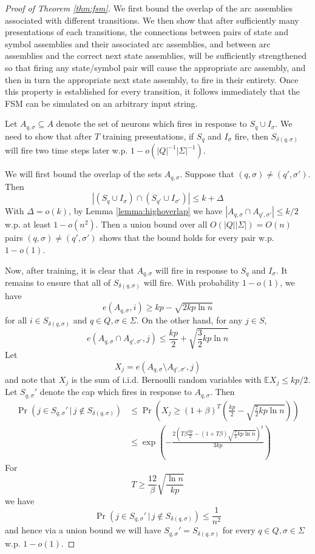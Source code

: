 \documentclass[12pt,nosubfloats]{alt2024} %
\newcommand{\E}{\mathbb{E}}
\newcommand{\1}{\mathbbm{1}}
\newcommand{\cond}{\, | \,}
\begin{document}
\begin{proof}[Proof of Theorem \ref{thm:fsm}]
We first bound the overlap of the arc assemblies associated with different transitions. We then show that after sufficiently many presentations of each transitions, the connections between pairs of state and symbol assemblies and their associated arc assemblies, and between arc assemblies and the correct next state assemblies, will be sufficiently strengthened so that firing any state/symbol pair will cause the appropriate arc assembly, and then in turn the appropriate next state assembly, to fire in their entirety. Once this property is established for every transition, it follows immediately that the FSM can be simulated on an arbitrary input string.

Let $A_{q, \sigma} \subseteq A$ denote the set of neurons which fires in response to $S_q \cup I_\sigma$. We need to show that after $T$ training presentations, if $S_q$ and $I_\sigma$ fire, then $S_{\delta(q, \sigma)}$ will fire two time steps later w.p. $1 - o(|Q|^{-1}|\Sigma|^{-1})$. 

We will first bound the overlap of the sets $A_{q, \sigma}$. Suppose that $(q, \sigma) \neq (q', \sigma')$. Then
\[|(S_q \cup I_\sigma) \cap (S_{q'} \cup I_{\sigma'})| \le k + \Delta\]
With $\Delta = o(k)$, by Lemma \ref{lemma:highoverlap} we have $|A_{q, \sigma} \cap A_{q', \sigma'}| \le k/2$ w.p. at least $1 - o(n^2)$. Then a union bound over all $O(|Q||\Sigma|) = O(n)$ pairs $(q, \sigma) \neq (q', \sigma')$ shows that the bound holds for every pair w.p. $1 - o(1)$. 

Now, after training, it is clear that $A_{q, \sigma}$ will fire in response to $S_q$ and $I_\sigma$. It remains to ensure that all of $S_{\delta(q, \sigma)}$ will fire. With probability $1 - o(1)$, we have
\[e(A_{q, \sigma}, i) \ge kp - \sqrt{2kp \ln n}\]
for all $i \in S_{\delta(q, \sigma)}$ and $q \in Q, \sigma \in \Sigma$. On the other hand, for any $j \in S$,
\[e(A_{q, \sigma} \cap A_{q', \sigma'}, j) \le \frac{kp}{2} + \sqrt{\frac{3}{2}kp \ln n}\]
Let
\[X_j = e(A_{q, \sigma} \setminus A_{q', \sigma'}, j)\]
and note that $X_j$ is the sum of i.i.d. Bernoulli random variables with $\E X_j \le kp / 2$. Let $S_{q, \sigma}'$ denote the cap which fires in response to $A_{q, \sigma}$. Then
\begin{align*}
    \Pr(j \in S_{q, \sigma}' \cond j \not\in S_{\delta(q, \sigma)}) &\le 
    \Pr\left(X_j \ge (1 + \beta)^T\left(\frac{kp}{2} - \sqrt{\frac{7}{2}kp \ln n}\right)\right)\\
    &\le \exp\left(-\frac{2(T\beta \frac{kp}{2} - (1 + T \beta) \sqrt{\frac{7}{2}kp \ln n})^2}{3kp}\right)
\end{align*} For 
\[T \ge \frac{12}{\beta} \sqrt{\frac{\ln n}{kp}}\]
we have
\[\Pr(j \in S_{q, \sigma}' \cond j \not\in S_{\delta(q, \sigma)}) \le \frac{1}{n^2}\]
and hence via a union bound we will have $S_{q, \sigma}' = S_{\delta(q, \sigma)}$ for every $q \in Q, \sigma \in \Sigma$ w.p. $1 - o(1)$.
\end{proof}
\end{document}
